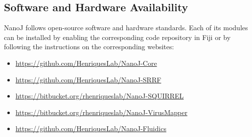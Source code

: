 \subsection*{Software and Hardware Availability}
 NanoJ follows open-source software and hardware standards. Each of its modules can be installed by enabling the corresponding code repository in Fiji or by following the instructions on the corresponding websites:
 \small
 \begin{itemize}
  \item \href{https://github.com/HenriquesLab/NanoJ-Core}{https://github.com/HenriquesLab/NanoJ-Core}
  \item \href{https://github.com/HenriquesLab/NanoJ-SRRF}{https://github.com/HenriquesLab/NanoJ-SRRF}
  \item \href{https://bitbucket.org/rhenriqueslab/nanoj-squirrel}{https://bitbucket.org/rhenriqueslab/NanoJ-SQUIRREL}
  \item \href{https://bitbucket.org/rhenriqueslab/NanoJ-VirusMapper}{https://bitbucket.org/rhenriqueslab/NanoJ-VirusMapper}
  \item \href{https://github.com/HenriquesLab/NanoJ-Fluidics}{https://github.com/HenriquesLab/NanoJ-Fluidics}
\end{itemize}





